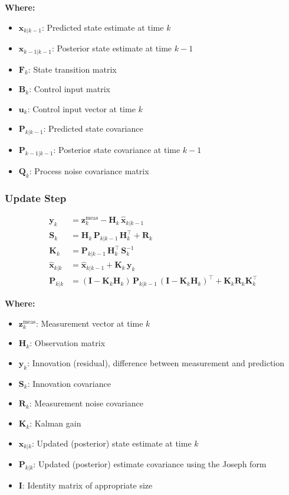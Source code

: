 \documentclass[11pt,letterpaper]{article}
\begin{document}
\textbf{Where:}
\begin{itemize}
  \item $\bm{x}_{k|k-1}$: Predicted state estimate at time $k$
  \item $\bm{x}_{k-1|k-1}$: Posterior state estimate at time $k-1$
  \item $\mathbf{F}_k$: State transition matrix
  \item $\mathbf{B}_k$: Control input matrix
  \item $\bm{u}_k$: Control input vector at time $k$
  \item $\mathbf{P}_{k|k-1}$: Predicted state covariance
  \item $\mathbf{P}_{k-1|k-1}$: Posterior state covariance at time $k-1$
  \item $\mathbf{Q}_k$: Process noise covariance matrix
\end{itemize}

\subsubsection*{Update Step}
\begin{align}
    \mathbf{y}_k &= \mathbf{z}^{\text{meas}}_k - \mathbf{H}_k \, \hat{\mathbf{x}}_{k|k-1} \\
    \mathbf{S}_k &= \mathbf{H}_k \, \mathbf{P}_{k|k-1} \, \mathbf{H}_k^\top + \mathbf{R}_k \\
    \mathbf{K}_k &= \mathbf{P}_{k|k-1} \, \mathbf{H}_k^\top \, \mathbf{S}_k^{-1} \\
    \hat{\mathbf{x}}_{k|k} &= \hat{\mathbf{x}}_{k|k-1} + \mathbf{K}_k \, \mathbf{y}_k \\
    \mathbf{P}_{k|k} &= (\mathbf{I} - \mathbf{K}_k \mathbf{H}_k) \, \mathbf{P}_{k|k-1} \, (\mathbf{I} - \mathbf{K}_k \mathbf{H}_k)^\top + \mathbf{K}_k \mathbf{R}_k \mathbf{K}_k^\top
\end{align}

\textbf{Where:}
\begin{itemize}
  \item $\bm{z}^{\text{meas}}_k$: Measurement vector at time $k$
  \item $\mathbf{H}_k$: Observation matrix
  \item $\bm{y}_k$: Innovation (residual), difference between measurement and prediction
  \item $\mathbf{S}_k$: Innovation covariance
  \item $\mathbf{R}_k$: Measurement noise covariance
  \item $\mathbf{K}_k$: Kalman gain
  \item $\bm{x}_{k|k}$: Updated (posterior) state estimate at time $k$
  \item $\mathbf{P}_{k|k}$: Updated (posterior) estimate covariance using the Joseph form
  \item $\mathbf{I}$: Identity matrix of appropriate size
\end{itemize}
\end{document}

